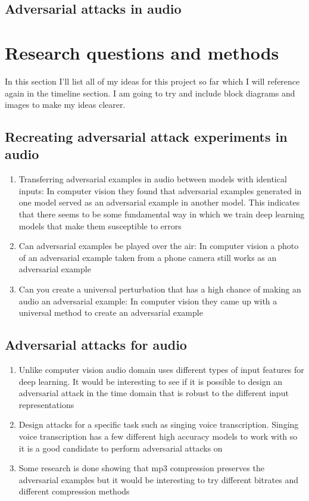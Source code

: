 \documentclass[journal,onecolumn]{IEEEtran}
\begin{document}
\subsection{Adversarial attacks in audio}




\section{Research questions and methods}

In this section I'll list all of my ideas for this project so far which I will reference again in the timeline section. I am going to try and include block diagrams and images to make my ideas clearer.

\subsection{Recreating adversarial attack experiments in audio}
\begin{enumerate}
\item Transferring adversarial examples in audio between models with identical inputs: In computer vision they found that adversarial examples generated in one model served as an adversarial example in another model. This indicates that there seems to be some fundamental way in which we train deep learning models that make them susceptible to errors
\item Can adversarial examples be played over the air: In computer vision a photo of an adversarial example taken from a phone camera still works as an adversarial example
\item Can you create a universal perturbation that has a high chance of making an audio an adversarial example: In computer vision they came up with a universal method to create an adversarial example
\end{enumerate}

\subsection{Adversarial attacks for audio}
\begin{enumerate}
\item Unlike computer vision audio domain uses different types of input features for deep learning. It would be interesting to see if it is possible to design an adversarial attack in the time domain that is robust to the different input representations
\item Design attacks for a specific task such as singing voice transcription. Singing voice transcription has a few different high accuracy models to work with so it is a good candidate to perform adversarial attacks on
\item Some research is done showing that mp3 compression preserves the adversarial examples but it would be interesting to try different bitrates and different compression methods
\end{enumerate}
\end{document}

